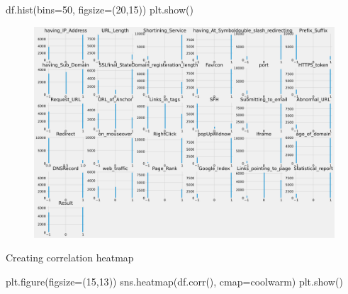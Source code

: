 \documentclass[
  letterpaper,
  DIV=11,
  numbers=noendperiod]{scrartcl}
\newenvironment{Shaded}{\begin{snugshade}}{\end{snugshade}}
\newcommand{\DecValTok}[1]{\textcolor[rgb]{0.68,0.00,0.00}{#1}}
\newcommand{\NormalTok}[1]{\textcolor[rgb]{0.00,0.23,0.31}{#1}}
\newcommand{\OperatorTok}[1]{\textcolor[rgb]{0.37,0.37,0.37}{#1}}
\newcommand{\StringTok}[1]{\textcolor[rgb]{0.13,0.47,0.30}{#1}}
\begin{document}
\begin{Shaded}
\begin{Highlighting}[]
\NormalTok{df.hist(bins}\OperatorTok{=}\DecValTok{50}\NormalTok{, figsize}\OperatorTok{=}\NormalTok{(}\DecValTok{20}\NormalTok{,}\DecValTok{15}\NormalTok{))}
\NormalTok{plt.show()}
\end{Highlighting}
\end{Shaded}

\begin{figure}[H]

{\centering \includegraphics{project_files/figure-pdf/cell-5-output-1.svg}

}

\end{figure}

Creating correlation heatmap

\begin{Shaded}
\begin{Highlighting}[]
\NormalTok{plt.figure(figsize}\OperatorTok{=}\NormalTok{(}\DecValTok{15}\NormalTok{,}\DecValTok{13}\NormalTok{))}
\NormalTok{sns.heatmap(df.corr(), cmap}\OperatorTok{=}\StringTok{\textquotesingle{}coolwarm\textquotesingle{}}\NormalTok{)}
\NormalTok{plt.show()}
\end{Highlighting}
\end{Shaded}
\end{document}
